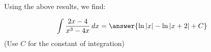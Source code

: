 \documentclass{ximera}
\begin{document}
\begin{exercise}
\begin{exercise}
\begin{exercise}
\begin{exercise}
\begin{exercise}
\begin{exercise}
Using the above results, we find:

 \[
\int \frac{2x-4}{x^3-4x} \d x = \answer{\ln|x|-\ln|x+2|+C}
\]
(Use $C$ for the constant of integration)


\end{exercise}
\end{exercise}
\end{exercise}
\end{exercise}
\end{exercise}
\end{exercise}
\end{document}
